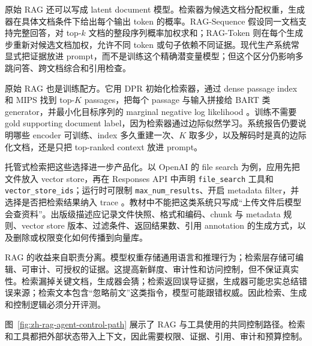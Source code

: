\documentclass[UTF8,zihao=-4,openany]{ctexbook}
\begin{document}
原始 RAG 还可以写成 latent document 模型。检索器为候选文档分配权重，生成器在具体文档条件下给出每个输出 token 的概率。RAG-Sequence 假设同一文档支持完整回答，对 top-$k$ 文档的整段序列概率加权求和；RAG-Token 则在每个生成步重新对候选文档加权，允许不同 token 或句子依赖不同证据。现代生产系统常显式把证据放进 prompt，而不是训练这个精确潜变量模型；但这个区分仍影响多跳问答、跨文档综合和引用检查。

原始 RAG 也是训练配方。它用 DPR 初始化检索器，通过 dense passage index 和 MIPS 找到 top-$K$ passages，把每个 passage 与输入拼接给 BART 类 generator，并最小化目标序列的 marginal negative log likelihood \cite{lewis2020retrieval,karpukhin2020dense}。训练不需要 gold supporting document label，因为检索器通过边际似然学习。系统报告仍要说明哪些 encoder 可训练、index 多久重建一次、$K$ 取多少，以及解码时是真的边际化文档，还是只把 top-ranked context 放进 prompt。

托管式检索把这些选择进一步产品化。以 OpenAI 的 file search 为例，应用先把文件放入 vector store，再在 Responses API 中声明 \texttt{file\_search} 工具和 \texttt{vector\_store\_ids}；运行时可限制 \texttt{max\_num\_results}、开启 metadata filter，并选择是否把检索结果纳入 trace \cite{openai2026responsesfile}。教材中不能把这类系统只写成“上传文件后模型会查资料”。出版级描述应记录文件快照、格式和编码、chunk 与 metadata 规则、vector store 版本、过滤条件、返回结果数、引用 annotation 的生成方式，以及删除或权限变化如何传播到向量库。

RAG 的收益来自职责分离。模型权重存储通用语言和推理行为；检索层存储可编辑、可审计、可授权的证据。这提高新鲜度、审计性和访问控制，但不保证真实性。检索漏掉关键文档，生成器会猜；检索返回误导证据，生成器可能忠实总结错误来源；检索文本包含“忽略前文”这类指令，模型可能跟错权威。因此检索、生成和控制逻辑必须分开评测。

图~\ref{fig:zh-rag-agent-control-path} 展示了 RAG 与工具使用的共同控制路径。检索和工具都把外部状态带入上下文，因此需要权限、证据、引用、审计和预算控制。
\end{document}
